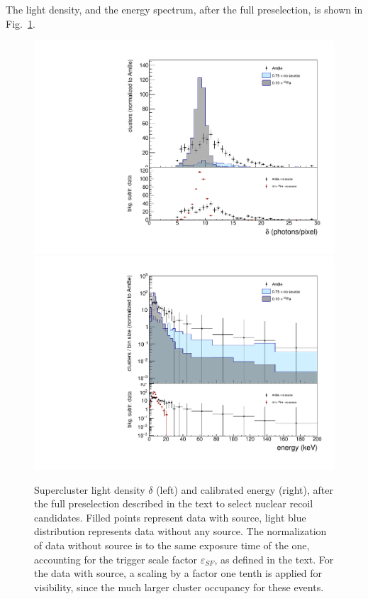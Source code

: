 The light density, and the energy spectrum, after the full
preselection, is shown in Fig.~\ref{fig:presel}.
\begin{figure}[ht]
  \begin{center}
  \includegraphics[width=0.45\linewidth]{figures/density_fullSel}
  \includegraphics[width=0.45\linewidth]{figures/energy_fullSel}

  \caption{Supercluster light density $\delta$ (left) and calibrated
    energy (right), after the full preselection described in the text
    to select nuclear recoil candidates.  Filled points represent data
    with \ambe source, light blue distribution represents data without
    any source.  The normalization of data without source is to the
    same exposure time of the \ambe one, accounting for the trigger
    scale factor $\varepsilon_{SF}$, as defined in the text. For the
    data with \fe source, a scaling by a factor one tenth is applied
    for visibility, since the much larger cluster occupancy for these
    events.  \label{fig:presel}}

  \end{center}
\end{figure}

